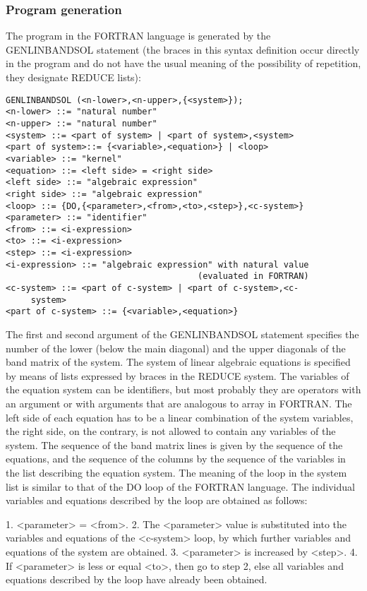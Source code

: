 \subsubsection{Program generation}

     The  program   in  the   FORTRAN  language   is  generated  by  the
GENLINBANDSOL statement (the  braces  in  this  syntax  definition occur
directly  in  the  program  and  do  not  have  the usual meaning of the
possibility of repetition, they designate REDUCE lists):
{\small\begin{verbatim}
GENLINBANDSOL (<n-lower>,<n-upper>,{<system>});
<n-lower> ::= "natural number"
<n-upper> ::= "natural number"
<system> ::= <part of system> | <part of system>,<system>
<part of system>::= {<variable>,<equation>} | <loop>
<variable> ::= "kernel"
<equation> ::= <left side> = <right side>
<left side> ::= "algebraic expression"
<right side> ::= "algebraic expression"
<loop> ::= {DO,{<parameter>,<from>,<to>,<step>},<c-system>}
<parameter> ::= "identifier"
<from> ::= <i-expression>
<to> ::= <i-expression>
<step> ::= <i-expression>
<i-expression> ::= "algebraic expression" with natural value
                                      (evaluated in FORTRAN)
<c-system> ::= <part of c-system> | <part of c-system>,<c-
     system>
<part of c-system> ::= {<variable>,<equation>}
\end{verbatim}}
The first and second  argument of the GENLINBANDSOL  statement specifies
the  number  of  the  lower  (below  the  main  diagonal)  and the upper
diagonals  of  the  band  matrix  of  the  system.  The system of linear
 algebraic equations is specified by means of lists expressed by  braces
{ } in the  REDUCE system. The variables  of the equation system  can be
identifiers, but most  probably they are  operators with an  argument or
with arguments that are analogous to array in FORTRAN. The left side  of
each equation has  to be a  linear combination of  the system variables,
the right side, on the contrary, is not allowed to contain any variables
of the system.  The sequence of  the band matrix  lines is given  by the
sequence  of  the  equations,  and  the  sequence  of the columns by the
sequence of the variables in the list describing the equation system.
     The meaning  of the  loop in  the system list is similar to that of
the DO loop  of  the  FORTRAN  language.  The  individual  variables and
equations described by the loop are obtained as follows:

  1. <parameter> = <from>.
  2.  The  <parameter>  value  is  substituted  into the variables and
  equations of the <c-system> loop,  by  which  further  variables and
  equations of the system are obtained.
  3. <parameter> is increased by <step>.
  4. If <parameter> is less or equal <to>, then go to step 2, else all
  variables and equations described  by  the  loop  have  already been
  obtained.

